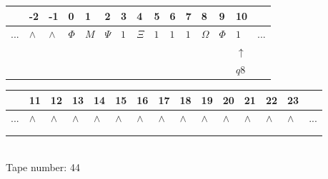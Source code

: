 \documentclass[11pt]{article}
\begin{document}
\begin{table}[H]
\centering
\begin{tabular}{lllllllllllllll}
 & -2 & -1 & 0 & 1 & 2 & 3 & 4 & 5 & 6 & 7 & 8 & 9 & 10 & \\
\hline
$...$ & \multicolumn{1}{|l|}{$\wedge$} & \multicolumn{1}{|l|}{$\wedge$} & \multicolumn{1}{|l|}{$\Phi$} & \multicolumn{1}{|l|}{$M$} & \multicolumn{1}{|l|}{$\Psi$} & \multicolumn{1}{|l|}{$1$} & \multicolumn{1}{|l|}{$\Xi$} & \multicolumn{1}{|l|}{$1$} & \multicolumn{1}{|l|}{$1$} & \multicolumn{1}{|l|}{$1$} & \multicolumn{1}{|l|}{$\Omega$} & \multicolumn{1}{|l|}{$\Phi$} & \multicolumn{1}{|l|}{$1$} & $...$\\
\hline
&  &  &  &  &  &  &  &  &  &  &  &  & $\uparrow$ &  \\
&  &  &  &  &  &  &  &  &  &  &  &  & $ q8 $ &  \\
\end{tabular}
\begin{tabular}{lllllllllllllll}
 & 11 & 12 & 13 & 14 & 15 & 16 & 17 & 18 & 19 & 20 & 21 & 22 & 23 & \\
\hline
$...$ & \multicolumn{1}{|l|}{$\wedge$} & \multicolumn{1}{|l|}{$\wedge$} & \multicolumn{1}{|l|}{$\wedge$} & \multicolumn{1}{|l|}{$\wedge$} & \multicolumn{1}{|l|}{$\wedge$} & \multicolumn{1}{|l|}{$\wedge$} & \multicolumn{1}{|l|}{$\wedge$} & \multicolumn{1}{|l|}{$\wedge$} & \multicolumn{1}{|l|}{$\wedge$} & \multicolumn{1}{|l|}{$\wedge$} & \multicolumn{1}{|l|}{$\wedge$} & \multicolumn{1}{|l|}{$\wedge$} & \multicolumn{1}{|l|}{$\wedge$} & $...$\\
\hline
&  &  &  &  &  &  &  &  &  &  &  &  &  &  \\
&  &  &  &  &  &  &  &  &  &  &  &  &  &  \\
\end{tabular}
\\
Tape number: 44
\noindent\makebox[\linewidth]{\hdashrule{\textwidth}{1pt}{1pt}}\end{table}
\end{document}
